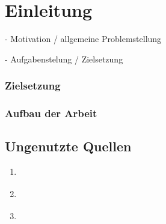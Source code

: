 \chapter{Einleitung}

- Motivation / allgemeine Problemstellung

- Aufgabenstelung / Zielsetzung

\subsection{Zielsetzung}

\subsection{Aufbau der Arbeit}



\section*{Ungenutzte Quellen}
\begin{enumerate}
	\item \cite[20ff]{DER_INTEGRATIONSTEST}
	\item \cite{MODELLGETRIEBENE_SOFTWAREENTWICKLUNG}
	\item \cite{DOMAIN_DRIVEN_DESIGN}
\end{enumerate}

